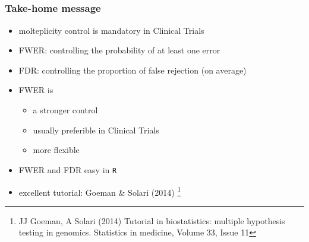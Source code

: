 \documentclass[xcolor={pdftex,dvipsnames,table}]{beamer}
\newcommand{\bi}{\begin {itemize}}
\newcommand{\ei}{\end{itemize}}
\newcommand{\bfr}[1]{\begin{frame} \frametitle{#1}}
\begin{document}
\subsection{}
\bfr{Take-home message}
\bi 
\item molteplicity control is mandatory in Clinical Trials 
\item FWER: controlling the probability of at least one error
\item FDR:  controlling the  proportion of false rejection (on average)
\item FWER is 
\bi
\item a stronger control
\item usually preferible in Clinical Trials
\item more flexible
\ei
\item FWER and FDR  easy in {\tt R}
\item excellent tutorial: Goeman \& Solari (2014) \footnote{
JJ Goeman, A Solari (2014) Tutorial in biostatistics: multiple hypothesis testing in genomics. Statistics in medicine, Volume 33, Issue 11}
\ei
\end{frame}
\end{document}
